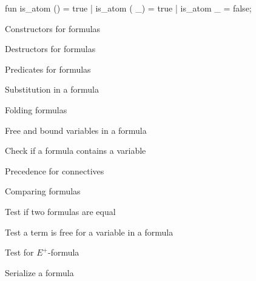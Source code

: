 fun is_atom () = true
  | is_atom ( _) = true
  | is_atom _ = false;

\LA{}Constructors for formulas~{\nwtagstyle{}}\RA{}

\LA{}Destructors for formulas~{\nwtagstyle{}}\RA{}

\LA{}Predicates for formulas~{\nwtagstyle{}}\RA{}

\LA{}Substitution in a formula~{\nwtagstyle{}}\RA{}

\LA{}Folding formulas~{\nwtagstyle{}}\RA{}

\LA{}Free and bound variables in a formula~{\nwtagstyle{}}\RA{}

\LA{}Check if a formula contains a variable~{\nwtagstyle{}}\RA{}

\LA{}Precedence for connectives~{\nwtagstyle{}}\RA{}

\LA{}Comparing formulas~{\nwtagstyle{}}\RA{}

\LA{}Test if two formulas are equal~{\nwtagstyle{}}\RA{}

\LA{}Test a term is free for a variable in a formula~{\nwtagstyle{}}\RA{}

\LA{}Test for $E^{+}$-formula~{\nwtagstyle{}}\RA{}

\LA{}Serialize a formula~{\nwtagstyle{}}\RA{}

